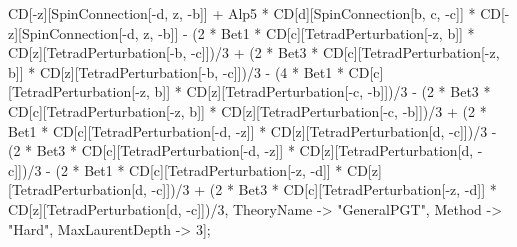 CD[-z][SpinConnection[-d, z, -b]] + Alp5 * CD[d][SpinConnection[b, c, -c]] * CD[-z][SpinConnection[-d, z, -b]] - (2 * Bet1 * CD[c][TetradPerturbation[-z, b]] * CD[z][TetradPerturbation[-b, -c]])/3 + (2 * Bet3 * CD[c][TetradPerturbation[-z, b]] * CD[z][TetradPerturbation[-b, -c]])/3 - (4 * Bet1 * CD[c][TetradPerturbation[-z, b]] * CD[z][TetradPerturbation[-c, -b]])/3 - (2 * Bet3 * CD[c][TetradPerturbation[-z, b]] * CD[z][TetradPerturbation[-c, -b]])/3 + (2 * Bet1 * CD[c][TetradPerturbation[-d, -z]] * CD[z][TetradPerturbation[d, -c]])/3 - (2 * Bet3 * CD[c][TetradPerturbation[-d, -z]] * CD[z][TetradPerturbation[d, -c]])/3 - (2 * Bet1 * CD[c][TetradPerturbation[-z, -d]] * CD[z][TetradPerturbation[d, -c]])/3 + (2 * Bet3 * CD[c][TetradPerturbation[-z, -d]] * CD[z][TetradPerturbation[d, -c]])/3, TheoryName -> "GeneralPGT", Method -> "Hard", MaxLaurentDepth -> 3]; 